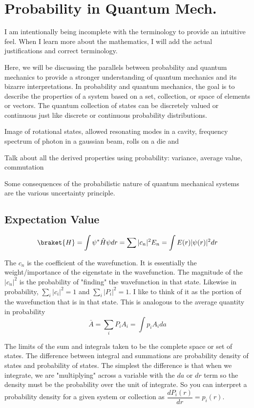 \documentclass[11pt,a4paper]{book}
\begin{document}
	\section{Probability in Quantum Mech.}
		\label{sec:Probability in Quantum Mech.}
		I am intentionally being incomplete with the terminology to provide an intuitive feel. When I learn more about the mathematics, I will add the actual justifications and correct terminology.
		
		Here, we will be discussing the parallels between probability and quantum mechanics to provide a stronger understanding of quantum mechanics and its bizarre interpretations. In probability and quantum mechanics, the goal is to describe the properties of a system based on a set, collection, or space of elements or vectors. The quantum collection of states can be discretely valued or continuous just like discrete or continuous probability distributions.
		
		Image of rotational states, allowed resonating modes in a cavity, frequency spectrum of photon in a gaussian beam, rolls on a die and 
		
		Talk about all the derived properties using probability: variance, average value, commutation
		
		Some consequences of the probabilistic nature of quantum mechanical systems are the various uncertainty principle.
		\subsection{Expectation Value}
			\begin{equation}
				\braket{H}=\int{\psi^* \hat{H} \psi}dr=\sum{|c_n|^2 E_n}=\int{E(r)|\psi(r)|^2dr}
			\end{equation}
			
			The $c_n$ is the coefficient of the wavefunction. It is essentially the weight/importance of the eigenstate in the wavefunction. The magnitude of the $|c_n|^2$ is the probability of "finding" the wavefunction in that state. Likewise in probability, $\sum_i |c_i|^2=1$ and $\sum_i |P_i|^2=1$. I like to think of it as the portion of the wavefunction that is in that state.
			This is analogous to the average quantity in probability
			\begin{equation}
				\bar{A}=\sum_i {P_i A_i}=\int{p_i A_i da}
			\end{equation}
			
			The limits of the sum and integrals taken to be the complete space or set of states. The difference between integral and summations are probability density of states and probability of states. The simplest the difference is that when we integrate, we are "multiplying" across a variable with the $da$ or $dr$ term so the density must be the probability over the unit of integrate. So you can interpret a probability density for a given system or collection as $\dfrac{dP_i(r)}{dr}=p_i(r)$.
	
\end{document}
